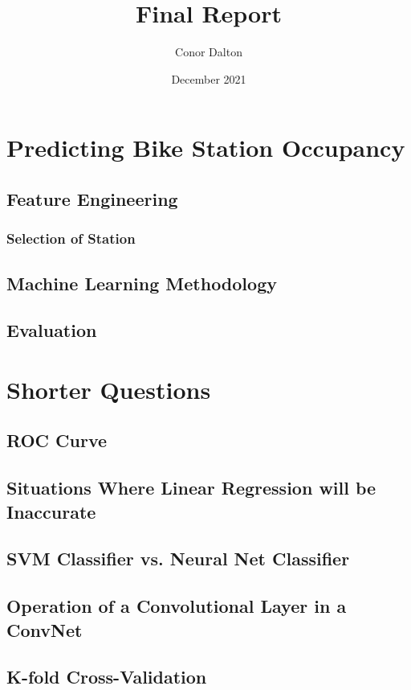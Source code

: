 \documentclass{article}
\title{Final Report}
\author{Conor Dalton}
\date{December 2021}
\begin{document}
\maketitle

\section{Predicting Bike Station Occupancy}
\subsection{Feature Engineering}
\subsubsection{Selection of Station}

\subsection{Machine Learning Methodology}

\subsection{Evaluation}

\section{Shorter Questions}

\subsection{ROC Curve}

\subsection{Situations Where Linear Regression will be Inaccurate}

\subsection{SVM Classifier vs. Neural Net Classifier}

\subsection{Operation of a Convolutional Layer in a ConvNet}

\subsection{K-fold Cross-Validation}




\end{document}
